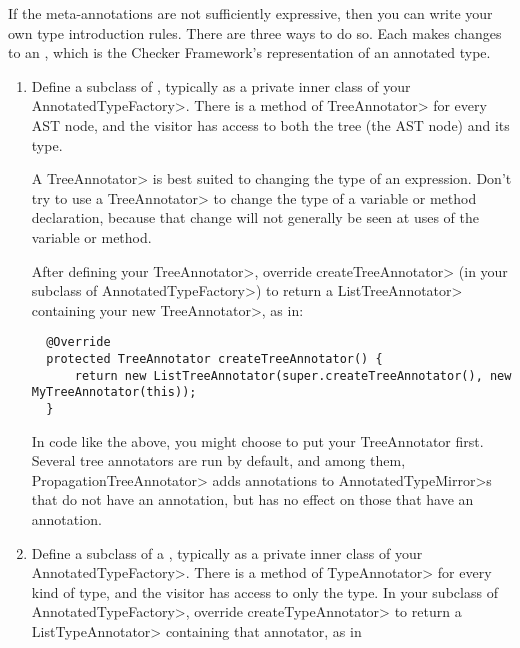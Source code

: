 
If the meta-annotations are not sufficiently expressive, then you
can write your own type introduction rules.  There are three ways to do so.
Each makes changes to an ,
which is the Checker Framework's representation of an annotated type.


\begin{enumerate}
\item
  Define a subclass of
  ,
  typically as a private inner class of your \<AnnotatedTypeFactory>.
  There is a method of \<TreeAnnotator> for every AST node, and the visitor
  has access to both the tree (the AST node) and its type.

  A \<TreeAnnotator> is best suited to changing the type of an expression.
  Don't try to use a \<TreeAnnotator> to change the type of a variable or
  method declaration, because that change will not generally be seen at
  uses of the variable or method.

  After defining your \<TreeAnnotator>, override \<createTreeAnnotator> (in
  your subclass of \<AnnotatedTypeFactory>) to return a
  \<ListTreeAnnotator> containing your new \<TreeAnnotator>, as in:

\begin{Verbatim}
  @Override
  protected TreeAnnotator createTreeAnnotator() {
      return new ListTreeAnnotator(super.createTreeAnnotator(), new MyTreeAnnotator(this));
  }
\end{Verbatim}

  \noindent
  In code like the above, you might choose to put your TreeAnnotator first.
  Several tree annotators are run by
  default, and among them, \<PropagationTreeAnnotator>
  adds annotations to \<AnnotatedTypeMirror>s that do not have an annotation,
  but has no effect on those that have an annotation.

\item
  Define a subclass of a
  ,
  typically as a private inner class of your \<AnnotatedTypeFactory>.
  There is a method of \<TypeAnnotator> for every kind of type, and the
  visitor has access to only the type.  In your subclass of
  \<AnnotatedTypeFactory>, override \<createTypeAnnotator> to return a
  \<ListTypeAnnotator> containing that annotator, as in


\end{enumerate}
